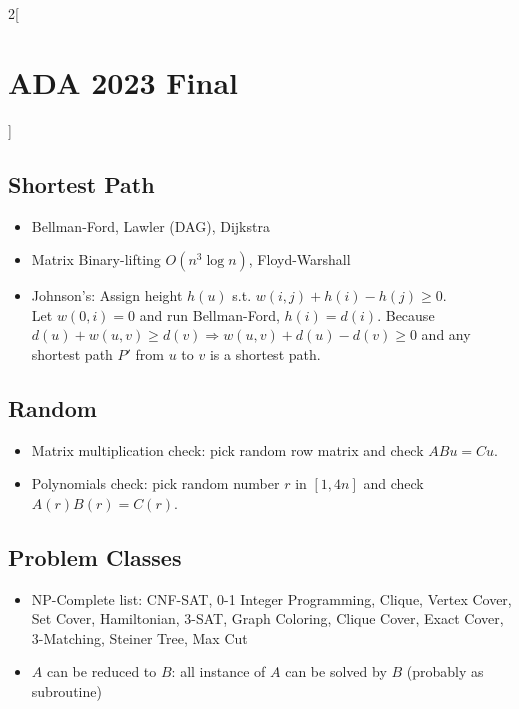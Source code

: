 \documentclass[10pt,a4paper]{report}
\begin{document}
\begin{multicols}{2}[\section*{ADA 2023 Final}]
\subsection*{Shortest Path}
  \begin{itemize} 
    \item Bellman-Ford, Lawler (DAG), Dijkstra                        \vspace{-0.65em}
    \item Matrix Binary-lifting $O(n^3 \log n)$, Floyd-Warshall       \vspace{-0.65em}
    \item Johnson's:  Assign height $h(u)$ s.t. $w(i, j) + h(i) - h(j) \geq 0$.\\
    Let $w(0, i) = 0$ and run Bellman-Ford, $h(i) = d(i)$. \quad Because $d(u) + w(u, v) \geq d(v) \Rightarrow w(u, v) + d(u) - d(v) \geq 0$ and any shortest path $P'$ from $u$ to $v$ is a shortest path. 
  \end{itemize}



\subsection*{Random}
  \begin{itemize}
    \item Matrix multiplication check: pick random row matrix and check $ABu = Cu$.       \vspace{-0.65em}
    \item Polynomials check: pick random number $r$ in $[1, 4n]$ and check $A(r)B(r) = C(r)$.
  \end{itemize}
  
\subsection*{Problem Classes}
  \begin{itemize}
    \item NP-Complete list: CNF-SAT, 0-1 Integer Programming, Clique, Vertex Cover, Set Cover, Hamiltonian, 3-SAT, Graph Coloring, Clique Cover, Exact Cover, 3-Matching, Steiner Tree, Max Cut       \vspace{-0.65em}
    \item $A$ can be reduced to $B$: all instance of $A$ can be solved by $B$ (probably as subroutine)
  \end{itemize}
  

\end{multicols}
\end{document}
